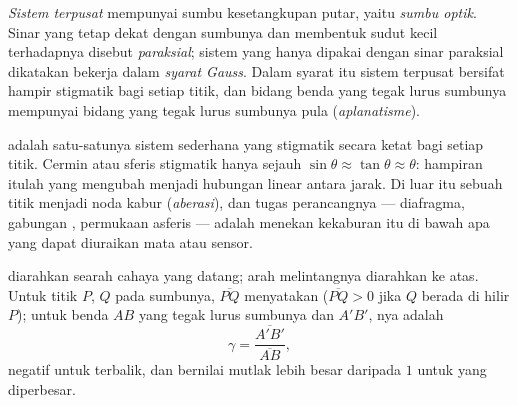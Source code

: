 \begin{definition}\label{def:b1:mirrors-thin-lenses:gauss}
\emph{Sistem terpusat} mempunyai sumbu kesetangkupan putar, yaitu
\emph{sumbu optik}. Sinar yang tetap dekat dengan sumbunya dan
membentuk sudut kecil terhadapnya disebut \emph{paraksial}; sistem yang
hanya dipakai dengan sinar paraksial dikatakan bekerja dalam
\emph{syarat Gauss}. Dalam syarat itu sistem terpusat bersifat hampir
stigmatik bagi setiap titik, dan bidang benda yang tegak lurus sumbunya
mempunyai bidang  yang tegak lurus sumbunya pula
(\emph{aplanatisme}).
\end{definition}
\admitted

\begin{remark}\label{rem:b1:mirrors-thin-lenses:why}
 adalah satu-satunya sistem sederhana yang stigmatik secara
ketat bagi setiap titik. Cermin atau  sferis stigmatik hanya
sejauh $\sin\theta \approx \tan\theta \approx \theta$: hampiran itulah
yang mengubah  menjadi hubungan linear antara jarak. Di luar
itu  sebuah titik menjadi noda kabur (\emph{aberasi}), dan
tugas perancangnya --- diafragma, gabungan , permukaan asferis ---
adalah menekan kekaburan itu di bawah apa yang dapat diuraikan mata
atau sensor.
\end{remark}

\begin{notation}\label{not:b1:mirrors-thin-lenses:signs}
 diarahkan searah cahaya yang datang; arah melintangnya
diarahkan ke atas. Untuk titik $P$, $Q$ pada sumbunya,
$\overline{PQ}$ menyatakan  ($\overline{PQ} > 0$
jika $Q$ berada di hilir $P$); untuk benda $AB$ yang tegak lurus
sumbunya dan  $A'B'$, \emph{}nya adalah
\[
\gamma = \frac{\overline{A'B'}}{\overline{AB}} ,
\]
negatif untuk  terbalik, dan bernilai mutlak lebih besar
daripada $1$ untuk  yang diperbesar.
\end{notation}

